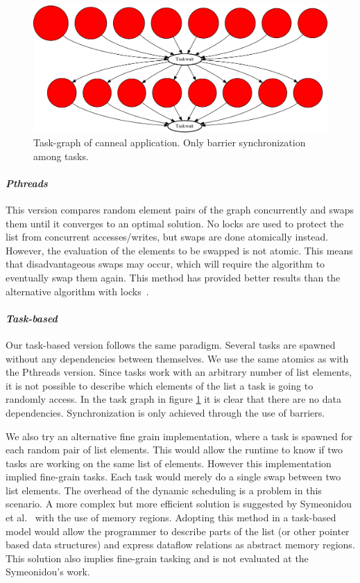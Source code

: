 {\begin{figure}[t!]%
	\center
	\includegraphics[width=.8\columnwidth]{ifcg/figures/canneal_taskgraph}%
	\caption{Task-graph of canneal application.  Only barrier synchronization among tasks.}
	\label{fig:canneal_tg}%
	\vspace{.5cm}
\end{figure}

\paragraph{\textit{Pthreads}} This version compares random element pairs of the graph
concurrently and swaps them until it converges to an optimal solution.  No locks are used
to protect the list from concurrent accesses/writes, but  swaps are done atomically
instead. However, the evaluation of the elements to be swapped is not atomic.  This means
that disadvantageous swaps may occur, which will require the algorithm to eventually swap
them again.  This method has provided better results than the alternative algorithm with
locks~\cite{bienia2008}.

\paragraph{\textit{Task-based}} Our task-based version follows the same paradigm.  Several
tasks are spawned without any dependencies between themselves. We use the same atomics as
with the Pthreads version.  Since tasks work with an arbitrary number of list elements, it
is not possible to describe which elements of the list a task is going to randomly access. 
In the task graph in figure \ref{fig:canneal_tg} it is clear that there are no data dependencies.
Synchronization is only achieved through the use of barriers.

We also try an alternative fine grain implementation, where a task is spawned for each
random pair of list elements.  This would allow the runtime to know if two tasks are
working on the same list of elements. However this implementation implied fine-grain
tasks. Each task would merely do a single swap between two list elements.  The overhead of
the dynamic scheduling is a problem in this scenario.  A more complex but more efficient
solution is suggested by Symeonidou et al.~\cite{Symeonidou:2013:DDR:2488551.2488558} with
the use of memory regions.  Adopting this method in a task-based model would allow the
programmer to describe parts of the list (or other pointer based data structures) and
express dataflow relations as abstract memory regions.  This solution also implies
fine-grain tasking and is not evaluated at the Symeonidou's work. 

}

